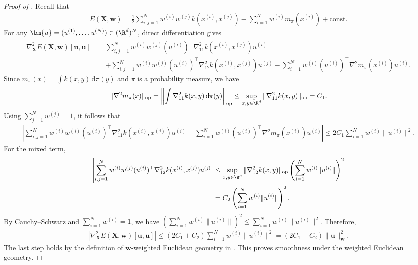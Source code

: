 \begin{proof}[Proof of ]
Recall that
\begin{align*}
E(\bm{X},\bm{w})
=
\frac{1}{2}\sum_{i,j=1}^N w^{(i)}w^{(j)} k(x^{(i)},x^{(j)})
-
\sum_{i=1}^N w^{(i)} m_\pi(x^{(i)})
+
\mathrm{const}.
\end{align*}
For any $\bm{u}=(u^{(1)},\ldots,u^{(N)})\in(\R^d)^N$, direct differentiation gives
\begin{align*}
\nabla_{\bm{X}}^2E(\bm{X},\bm{w})[\bm{u},\bm{u}]
={}&
\sum_{i,j=1}^N
w^{(i)}w^{(j)}
(u^{(i)})^\top\nabla_{11}^2 k(x^{(i)},x^{(j)})u^{(i)}
\\
&+
\sum_{i,j=1}^N
w^{(i)}w^{(j)}
(u^{(i)})^\top\nabla_{12}^2 k(x^{(i)},x^{(j)})u^{(j)}
-
\sum_{i=1}^N
w^{(i)}
(u^{(i)})^\top\nabla^2m_\pi(x^{(i)})u^{(i)}.
\end{align*}
Since $m_\pi(x)=\int k(x,y)\,\mathrm{d}\pi(y)$ and $\pi$ is a probability measure, we have
\begin{align*}
\|\nabla^2m_\pi(x)\|_{\mathrm{op}}
=
\left\|
\int\nabla_{11}^2 k(x,y)\,\mathrm{d}\pi(y)
\right\|_{\mathrm{op}}
\leq
\sup_{x,y\in\R^d}
\|\nabla_{11}^2 k(x,y)\|_{\mathrm{op}} = C_1.
\end{align*}
Using $\sum_{j=1}^Nw^{(j)}=1$, it follows that
\begin{align*}
\left|
\sum_{i,j=1}^N w^{(i)} w^{(j)} (u^{(i)})^\top\nabla_{11}^2 k(x^{(i)},x^{(j)})u^{(i)} - \sum_{i=1}^N w^{(i)} (u^{(i)})^\top\nabla^2m_\pi(x^{(i)})u^{(i)}
\right| \leq 2 C_1
\sum_{i=1}^Nw^{(i)}\|u^{(i)}\|^2.
\end{align*}
For the mixed term,
\begin{align*}
\left|
\sum_{i,j=1}^N
w^{(i)}w^{(j)}
(u^{(i)})^\top\nabla_{12}^2 k(x^{(i)},x^{(j)})u^{(j)}
\right|
&\leq
\sup_{x,y\in\R^d}
\|\nabla_{12}^2 k(x,y)\|_{\mathrm{op}}
\left(\sum_{i=1}^Nw^{(i)}\|u^{(i)}\|\right)^2 \\
&= C_2 \left(\sum_{i=1}^Nw^{(i)}\|u^{(i)}\|\right)^2 .
\end{align*}
By Cauchy--Schwarz and $\sum_{i=1}^Nw^{(i)}=1$, we have
$\left(\sum_{i=1}^N w^{(i)}\|u^{(i)}\|\right)^2
\leq \sum_{i=1}^Nw^{(i)}\|u^{(i)}\|^2$. Therefore,
\begin{align*}
\left|
\nabla_{\bm{X}}^2 E(\bm{X},\bm{w})[\bm{u},\bm{u}]
\right| \leq \left( 2C_1 + C_2\right) \sum_{i=1}^N w^{(i)}\|u^{(i)}\|^2 = \left( 2C_1 + C_2\right) \|\bm{u}\|_{\bm{w}}^2.
\end{align*}
The last step holds by the definition of $\bm{w}$-weighted Euclidean geometry in . 
This proves smoothness under the weighted Euclidean geometry.


\end{proof}
